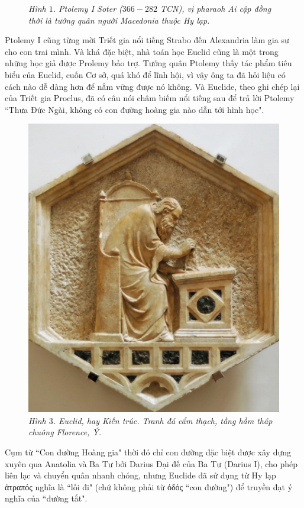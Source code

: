 \begin{multicols}{2}
\begin{figure}[H]
		\caption{\small\textit{\color{quantoan}Hình $1$. Ptolemy I Soter ($366-282$ TCN), vị pharaoh Ai cập đồng thời là tướng quân người Macedonia thuộc Hy lạp.}}
		\vspace*{-12pt}
	\end{figure}
	Ptolemy I cũng  từng mời Triết gia nổi tiếng Strabo đến Alexandria làm gia sư cho con trai mình. Và khá đặc biệt, nhà toán học Euclid cũng là một trong những học giả được Prolemy bảo trợ. Tướng quân Ptolemy thấy tác phẩm tiêu biểu của Euclid, cuốn Cơ sở, quá khó để lĩnh hội, vì vậy ông ta  đã hỏi liệu có cách nào dễ dàng hơn để nắm vững được nó không. Và Euclide, theo ghi chép lại của Triết gia Proclus, đã có câu nói châm biếm nổi tiếng sau để trả lời Ptolemy ``Thưa Đức Ngài, không có con đường hoàng gia nào dẫn tới hình học".
	\begin{figure}[H]
		\vspace*{-5pt}
		\centering
		\captionsetup{labelformat= empty, justification=centering}
		\includegraphics[width= 0.6\linewidth]{4}
		\caption{\small\textit{\color{quantoan}Hình $3$. Euclid, hay Kiến trúc. Tranh đá cẩm thạch, tầng hầm tháp chuông Florence, Ý.}}
		\vspace*{-10pt}
	\end{figure}
	Cụm từ ``Con đường Hoàng gia" thời đó chỉ  con đường đặc biệt được xây dựng xuyên qua Anatolia và Ba Tư bởi Darius Đại đế của Ba Tư (Darius I), cho phép liên lạc và chuyển quân nhanh chóng, nhưng Euclide đã sử dụng từ Hy lạp  ἀτραπός nghĩa là ``lối đi" (chứ không phải từ ὁδός ``con đường")  để truyền đạt ý nghĩa của ``đường tắt".
	\begin{figure}[H]
		\vspace*{-5pt}
		\centering

\end{figure}
\end{multicols}

